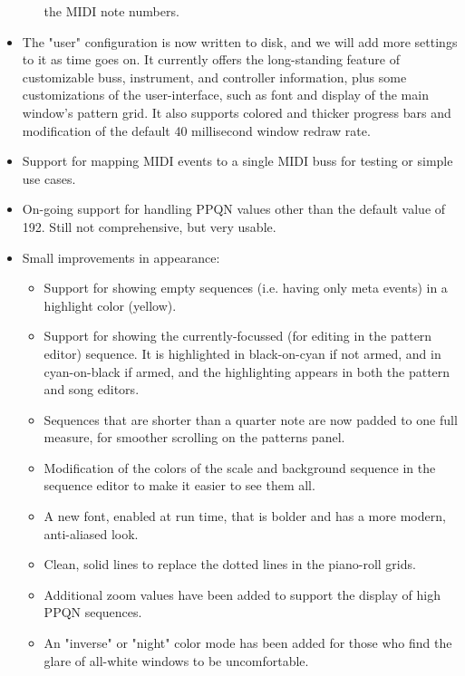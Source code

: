 \documentclass[
 11pt,
 twoside,
 a4paper,
 headinclude,
 footinclude,
 final                                 %
]{article}
\begin{document}
\begin{itemize}
\begin{itemize}
            the MIDI note numbers.  
      \end{itemize}
      \item The "user" configuration is now written to disk, and we will
         add more settings to it as time goes on.  It currently offers the
         long-standing feature of customizable buss, instrument, and controller
         information, plus some customizations of the user-interface, such as
         font and display of the main window's pattern grid.  It also supports
         colored and thicker progress bars and modification of the default 40
         millisecond window redraw rate.
      \item Support for mapping MIDI events to a single MIDI buss for testing
         or simple use cases.
      \item On-going support for handling PPQN values other than the
         default value of 192.  Still not comprehensive, but very usable.
      \item Small improvements in appearance:
      \begin{itemize}
         \item Support for showing empty sequences (i.e. having only meta
            events) in a highlight color (yellow).
         \item Support for showing the currently-focussed (for editing in the
            pattern editor) sequence.  It is highlighted in black-on-cyan if
            not armed, and in cyan-on-black if armed, and the highlighting
            appears in both the pattern and song editors.
         \item Sequences that are shorter than a quarter note are now padded to
            one full measure, for smoother scrolling on the patterns panel.
         \item Modification of the colors of the scale and background sequence
            in the sequence editor to make it easier to see them all.
         \item A new font, enabled at run time, that is bolder and has a
            more modern, anti-aliased look.
         \item Clean, solid lines to replace the dotted lines in the piano-roll
            grids.
         \item Additional zoom values have been added to support the display
            of high PPQN sequences.
         \item An "inverse" or "night" color mode has been added for those
            who find the glare of all-white windows to be uncomfortable.

\end{itemize}
\end{itemize}
\end{document}
